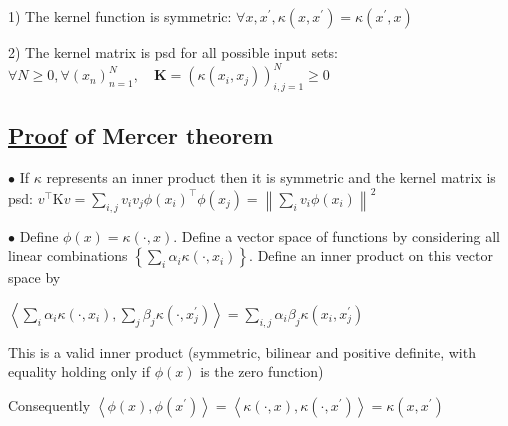 1) The kernel function is symmetric:
$
\forall x, x^{\prime}, \kappa\left(x, x^{\prime}\right)=\kappa\left(x^{\prime}, x\right)
$

2) The kernel matrix is psd for all possible input sets:
$
\forall N \geq 0, \forall\left(x_{n}\right)_{n=1}^{N}, \quad \mathbf{K}=\left(\kappa\left(x_{i}, x_{j}\right)\right)_{i, j=1}^{N} \geqslant 0
$

\subsection*{\underline{Proof} of Mercer theorem}
$\bullet$ If $\kappa$ represents an inner product then it is symmetric and the kernel matrix is psd:
$
v^{\top} \mathrm{K} v=\sum_{i, j} v_{i} v_{j} \phi\left(x_{i}\right)^{\top} \phi\left(x_{j}\right)=\left\|\sum_{i} v_{i} \phi\left(x_{i}\right)\right\|^{2}
$

$\bullet$ Define $\phi(x)=\kappa(\cdot, x)$. Define a vector space of functions by considering all linear combinations $\left\{\sum_{i} \alpha_{i} \kappa\left(\cdot, x_{i}\right)\right\}$. Define an inner product on this vector space by

$
\left\langle\sum_{i} \alpha_{i} \kappa\left(\cdot, x_{i}\right), \sum_{j} \beta_{j} \kappa\left(\cdot, x_{j}^{\prime}\right)\right\rangle=\sum_{i, j} \alpha_{i} \beta_{j} \kappa\left(x_{i}, x_{j}^{\prime}\right)
$

This is a valid inner product (symmetric, bilinear and positive definite, with equality holding only if $\phi(x)$ is the zero function)

Consequently
$
\left\langle\phi(x), \phi\left(x^{\prime}\right)\right\rangle=\left\langle\kappa(\cdot, x), \kappa\left(\cdot, x^{\prime}\right)\right\rangle=\kappa\left(x, x^{\prime}\right)
$
